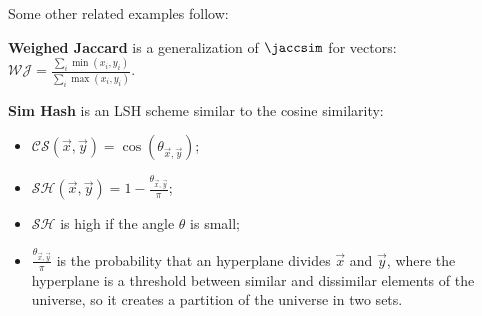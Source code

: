 Some other related examples follow:

\ex \textbf{Weighed Jaccard} is a generalization of $\jaccsim$ for vectors: \\ $\mathcal{WJ}=\frac
	{\sum_i \min(x_i, y_i)}{\sum_i \max(x_i, y_i)}$.

\ex \textbf{Sim Hash} is an LSH scheme similar to the cosine similarity:
\begin{itemize}
	\item $\mathcal{CS}(\vec{x},\vec{y})=
		\cos(\theta_{\vec{x},\vec{y}}) $;
	\item $\mathcal{SH}(\vec{x},\vec{y})=
		1-\frac{\theta_{\vec{x},\vec{y}}}{\pi} $;
	\item $\mathcal{SH}$ is high if the angle $\theta$ is small;
	\item $\frac{\theta_{\vec{x},\vec{y}}}{\pi}$ is the probability that an hyperplane divides $\vec{x}$ and $\vec{y}$, where the hyperplane is a threshold between similar and dissimilar elements of the universe, so it creates a partition of the universe in two sets.
\end{itemize}

